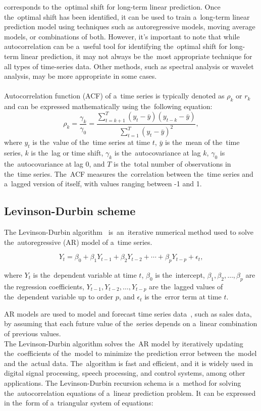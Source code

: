 corresponds to the~optimal shift for long-term linear prediction. Once the~optimal shift has been identified, it can
be used to train a~long-term linear prediction model using techniques such as autoregressive models, moving average
models, or combinations of both. However, it's important to note that while autocorrelation can be a~useful tool for
identifying the~optimal shift for long-term linear prediction, it may not always be the~most appropriate technique for
all types of time-series data. Other methods, such as spectral analysis or wavelet analysis, may be more
appropriate in some cases.\\
\\
Autocorrelation function (ACF) of a~time series is typically denoted as $\rho_k$ or $r_k$ and can be expressed
mathematically using the~following equation:
\begin{equation}
    \rho_k = \frac{\gamma_k}{\gamma_0} = \frac{\sum_{t=k+1}^{T}(y_t - \bar{y})(y_{t-k} - \bar{y})}{\sum_{t=1}^{T}(y_t - \bar{y})^2},
\end{equation}
where $y_t$ is the~value of the~time series at time $t$, $\bar{y}$ is the~mean of the~time series, $k$ is the~lag or
time shift, $\gamma_k$ is the~autocovariance at lag $k$, $\gamma_0$ is the~autocovariance at lag 0, and $T$ is the~total number
of observations in the~time series. The~ACF measures the~correlation between the~time series and a~lagged version of
itself, with values ranging between -1 and 1.

\subsection{Levinson-Durbin scheme} \label{subsec:levinson}

The Levinson-Durbin algorithm~\cite{Levinson} is~an~iterative numerical method used to solve the~autoregressive
(AR) model of a~time series.

\begin{equation}
    \label{eq:levinson}
    Y_t = \beta_0 + \beta_1 Y_{t-1} + \beta_2 Y_{t-2} + \cdots + \beta_p Y_{t-p} + \epsilon_t,
\end{equation}

where $Y_t$ is the~dependent variable at time $t$, $\beta_0$ is the~intercept, $\beta_1, \beta_2, \dots, \beta_p$ are the
regression coefficients, $Y_{t-1}, Y_{t-2}, \dots, Y_{t-p}$ are the~lagged values of the~dependent variable up to
order $p$, and $\epsilon_t$ is the~error term at time $t$.

AR models are used to model and forecast time series data~\cite{Durbin}, such as sales data, by assuming that each
future value of the~series depends on a~linear combination of previous values.
\\
The Levinson-Durbin algorithm solves the~AR model by iteratively updating the~coefficients of the~model to minimize
the prediction error between the~model and the~actual data. The~algorithm is fast and efficient, and it is widely
used in digital signal processing, speech processing, and control systems, among other applications.
The Levinson-Durbin recursion schema is a~method for solving the~autocorrelation equations of a~linear
prediction problem. It can be expressed in the~form of a~triangular system of equations:

